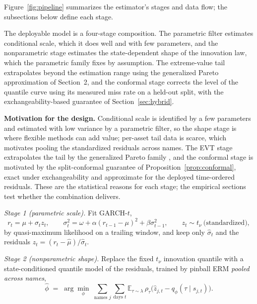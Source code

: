 \documentclass[11pt]{article}
\theoremstyle{remark}
\begin{document}
Figure~\ref{fig:pipeline} summarizes the estimator's stages and data
flow; the subsections below define each stage.

The deployable model is a four-stage composition. The parametric
filter estimates conditional scale, which it does well and with few
parameters, and the nonparametric stage estimates the state-dependent
shape of the innovation law, which the parametric family fixes by
assumption. The extreme-value tail extrapolates beyond the estimation
range using the generalized Pareto approximation of Section~2, and the
conformal stage corrects the level of the quantile curve using its
measured miss rate on a held-out split, with the exchangeability-based
guarantee of Section~\ref{sec:hybrid}.

\noindent\textbf{Motivation for the design.} Conditional scale is
identified by a few parameters and estimated with low variance by a
parametric filter, so the shape stage is where flexible methods can
add value; per-asset tail data is scarce, which motivates pooling the
standardized residuals across names. The EVT stage extrapolates the
tail by the generalized Pareto family \citep{balkema1974,
pickands1975}, and the conformal stage is motivated by the
split-conformal guarantee of Proposition~\ref{prop:conformal}, exact
under exchangeability and approximate for the deployed time-ordered
residuals. These are the
statistical reasons for each stage; the empirical sections test
whether the combination delivers.

\emph{Stage 1 (parametric scale).} Fit GARCH-$t$,
\begin{equation}
r_t = \mu + \sigma_t z_t,\qquad
\sigma_t^2 = \omega + \alpha (r_{t-1}-\mu)^2 + \beta \sigma_{t-1}^2,
\qquad z_t \sim t_\nu \ \text{(standardized)},
\label{eq:garch}
\end{equation}
by quasi-maximum likelihood on a trailing window, and keep only
$\widehat{\sigma}_t$ and the residuals
$\widehat{z}_t = (r_t-\widehat{\mu})/\widehat{\sigma}_t$.

\emph{Stage 2 (nonparametric shape).} Replace the fixed $t_\nu$
innovation quantile with a state-conditioned quantile model of the
residuals, trained by pinball ERM \emph{pooled across names},
\begin{equation}
\widehat{\phi} \;=\; \arg\min_{\phi}\;
\sum_{\text{names } j}\sum_{\text{days } t}
\mathbb{E}_{\tau\sim\lambda}\,
\rho_\tau\!\big(\widehat{z}_{j,t} - q_\phi(\tau \mid s_{j,t})\big).
\label{eq:shapeERM}
\end{equation}
\end{document}
